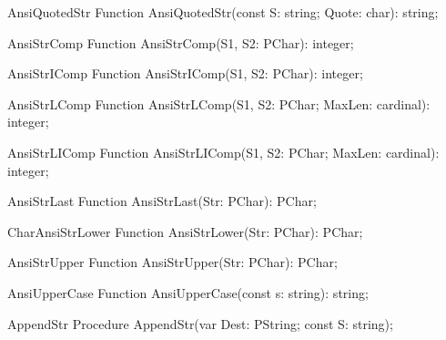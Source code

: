  
\begin{function}{AnsiQuotedStr}
\Declaration
Function AnsiQuotedStr(const S: string; Quote: char): string;
\Description
\Errors
\SeeAlso
\end{function}

 
\begin{function}{AnsiStrComp}
\Declaration
Function AnsiStrComp(S1, S2: PChar): integer;
\Description
\Errors
\SeeAlso
\end{function}

 
\begin{function}{AnsiStrIComp}
\Declaration
Function AnsiStrIComp(S1, S2: PChar): integer;
\Description
\Errors
\SeeAlso
\end{function}

 
\begin{function}{AnsiStrLComp}
\Declaration
Function AnsiStrLComp(S1, S2: PChar; MaxLen: cardinal): integer;
\Description
\Errors
\SeeAlso
\end{function}

 
\begin{function}{AnsiStrLIComp}
\Declaration
Function AnsiStrLIComp(S1, S2: PChar; MaxLen: cardinal): integer;
\Description
\Errors
\SeeAlso
\end{function}

 
\begin{function}{AnsiStrLast}
\Declaration
Function AnsiStrLast(Str: PChar): PChar;
\Description
\Errors
\SeeAlso
\end{function}

 
\begin{function}{CharAnsiStrLower}
\Declaration
Function AnsiStrLower(Str: PChar): PChar;
\Description
\Errors
\SeeAlso
\end{function}

 
\begin{function}{AnsiStrUpper}
\Declaration
Function AnsiStrUpper(Str: PChar): PChar;
\Description
\Errors
\SeeAlso
\end{function}

 
\begin{function}{AnsiUpperCase}
\Declaration
Function AnsiUpperCase(const s: string): string;
\Description
\Errors
\SeeAlso
\end{function}

 
\begin{procedure}{AppendStr}
\Declaration
Procedure AppendStr(var Dest: PString; const S: string);
\Description
\Errors
\SeeAlso
\end{procedure}

